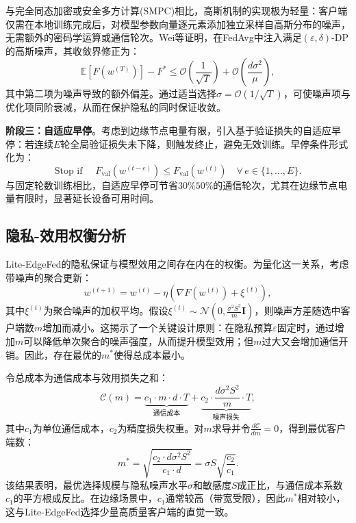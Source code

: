 \documentclass[a4paper,12pt]{article}
\begin{document}
与完全同态加密或安全多方计算(SMPC)相比，高斯机制的实现极为轻量：客户端仅需在本地训练完成后，对模型参数向量逐元素添加独立采样自高斯分布的噪声，无需额外的密码学运算或通信轮次。Wei等\cite{wei2020federated}证明，在FedAvg中注入满足$(\varepsilon, \delta)$-DP的高斯噪声，其收敛界修正为：
\begin{equation}
\mathbb{E}[F(w^{(T)})] - F^* \leq \mathcal{O}\left(\frac{1}{\sqrt{T}}\right) + \mathcal{O}\left(\frac{d\sigma^2}{\mu}\right),
\end{equation}
其中第二项为噪声导致的额外偏差。通过适当选择$\sigma = \mathcal{O}(1/\sqrt{T})$，可使噪声项与优化项同阶衰减，从而在保护隐私的同时保证收敛。

\textbf{阶段三：自适应早停}。考虑到边缘节点电量有限，引入基于验证损失的自适应早停：若连续$E$轮全局验证损失未下降，则触发终止，避免无效训练。早停条件形式化为：
\begin{equation}
\text{Stop if } \quad F_{\text{val}}(w^{(t-e)}) \leq F_{\text{val}}(w^{(t)}) \quad \forall \, e \in \{1, \dots, E\}.
\end{equation}
与固定轮数训练相比，自适应早停可节省$30\%$\text{--}$50\%$的通信轮次，尤其在边缘节点电量有限时，显著延长设备可用时间。

\subsection{隐私-效用权衡分析}

Lite-EdgeFed的隐私保证与模型效用之间存在内在的权衡。为量化这一关系，考虑带噪声的聚合更新：
\begin{equation}
w^{(t+1)} = w^{(t)} - \eta \left( \nabla F(w^{(t)}) + \xi^{(t)} \right),
\end{equation}
其中$\xi^{(t)}$为聚合噪声的加权平均。假设$\xi^{(t)} \sim \mathcal{N}(0, \frac{\sigma^2 S^2}{m} \mathbf{I})$，则噪声方差随选中客户端数$m$增加而减小。这揭示了一个关键设计原则：在隐私预算$\varepsilon$固定时，通过增加$m$可以降低单次聚合的噪声强度，从而提升模型效用；但$m$过大又会增加通信开销。因此，存在最优的$m^*$使得总成本最小。

令总成本为通信成本与效用损失之和：
\begin{equation}
\mathcal{C}(m) = \underbrace{c_1 \cdot m \cdot d \cdot T}_{\text{通信成本}} + \underbrace{c_2 \cdot \frac{d\sigma^2 S^2}{m} \cdot T}_{\text{噪声损失}},
\end{equation}
其中$c_1$为单位通信成本，$c_2$为精度损失权重。对$m$求导并令$\frac{d\mathcal{C}}{dm} = 0$，得到最优客户端数：
\begin{equation}
m^* = \sqrt{\frac{c_2 \cdot d\sigma^2 S^2}{c_1 \cdot d}} = \sigma S \sqrt{\frac{c_2}{c_1}}.
\end{equation}
该结果表明，最优选择规模与隐私噪声水平$\sigma$和敏感度$S$成正比，与通信成本系数$c_1$的平方根成反比。在边缘场景中，$c_1$通常较高（带宽受限），因此$m^*$相对较小，这与Lite-EdgeFed选择少量高质量客户端的直觉一致。
\end{document}
